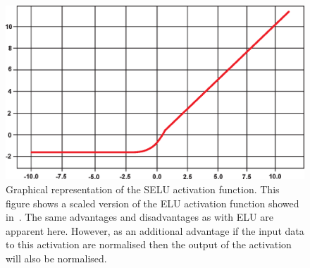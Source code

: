             \begin{figure}
                \centering
                
                \includegraphics[width=1.0\linewidth]{figures/background_selu.png}
                
                \captionsetup{singlelinecheck=false}
                \caption{
                    Graphical representation of the \gls{SELU} activation function. This figure shows a scaled version of the \gls{ELU} activation function showed in~. The same advantages and disadvantages as with \gls{ELU} are apparent here. However, as an additional advantage if the input data to this activation are normalised then the output of the activation will also be normalised.
                }
                \label{sec:pseudo_bayesian_dip_denoising_as_a_preprocessing_step_for_kinetic_modelling_in_dynamic_pet_appendix_methods_network_design_and_execution_selu}
            \end{figure}

